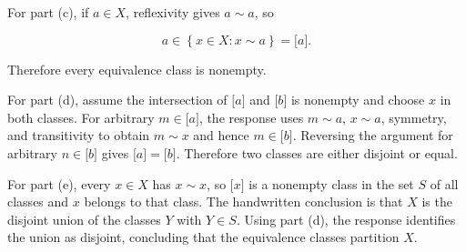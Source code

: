 For part (c), if \(a \in X\), reflexivity gives \(a \sim a\), so

\[a \in \left\{ {x \in X:x \sim a} \right\} = \lbrack a\rbrack.\]

Therefore every equivalence class is nonempty.

For part (d), assume the intersection of \(\lbrack a\rbrack\) and \(\lbrack b\rbrack\) is nonempty and choose \(x\) in both classes. For arbitrary \(m \in \lbrack a\rbrack\), the response uses \(m \sim a\), \(x \sim a\), symmetry, and transitivity to obtain \(m \sim x\) and hence \(m \in \lbrack b\rbrack\). Reversing the argument for arbitrary \(n \in \lbrack b\rbrack\) gives \(\lbrack a\rbrack = \lbrack b\rbrack\). Therefore two classes are either disjoint or equal.

For part (e), every \(x \in X\) has \(x \sim x\), so \(\lbrack x\rbrack\) is a nonempty class in the set \(S\) of all classes and \(x\) belongs to that class. The handwritten conclusion is that \(X\) is the disjoint union of the classes \(Y\) with \(Y \in S\). Using part (d), the response identifies the union as disjoint, concluding that the equivalence classes partition \(X\).
